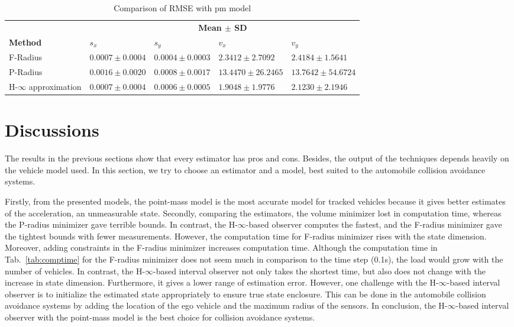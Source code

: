 \begin{table}[!h]
\caption{Comparison of RMSE with pm model}
	\centering
	\renewcommand{\arraystretch}{1.1}
	\small	
	\begin{tabular}{l l l l l}
		\toprule 
		& \multicolumn{4}{c}{\textbf{Mean $\pm$ SD}} \\ \cmidrule{2-5}
		\textbf{Method} & \textbf{$s_x$} & \textbf{$s_y$} & \textbf{$v_x$} & \textbf{$v_y$}\\ \midrule
		F-Radius & $0.0007\pm 0.0004$ &  $0.0004  \pm 0.0003$ &  $2.3412 \pm 2.7092$ &   $2.4184 \pm 1.5641$ \\
		P-Radius & $0.0016 \pm 0.0020$ &   $0.0008 \pm 0.0017$  & $13.4470 \pm 26.2465$ &  $13.7642 \pm 54.6724$\\
		H-$\infty$ approximation & $0.0007 \pm 0.0004$ &  $0.0006 \pm 0.0005$   & $1.9048 \pm  1.9776$  &  $ 2.1230 \pm  2.1946$\\
		\bottomrule
	\end{tabular}
	\label{tab:errormean}
\end{table}

\section{Discussions}
The results in the previous sections show that every estimator has pros and cons. Besides, the output of the techniques depends heavily on the vehicle model used. In this section, we try to choose an estimator and a model, best suited to the automobile collision avoidance systems. 

Firstly, from the presented models, the point-mass model is the most accurate model for tracked vehicles because it gives better estimates of the acceleration, an unmeasurable state. Secondly, comparing the estimators, the volume minimizer lost in computation time, whereas the P-radius minimizer gave terrible bounds. In contrast, the H-$\infty$-based observer computes the fastest, and the F-radius minimizer gave the tightest bounds with fewer measurements. However, the computation time for F-radius minimizer rises with the state dimension. Moreover, adding constraints in the F-radius minimizer increases computation time. Although the computation time in Tab.~\ref{tab:comptime} for the F-radius minimizer does not seem much in comparison to the time step (0.1s), the load would grow with the number of vehicles. In contrast, the H-$\infty$-based interval observer not only takes the shortest time, but also does not change with the increase in state dimension. Furthermore, it gives a lower range of estimation error. However, one challenge with the H-$\infty$-based interval observer is to initialize the estimated state appropriately to ensure true state enclosure. This can be done in the automobile collision avoidance systems by adding the location of the ego vehicle and the maximum radius of the sensors. In conclusion, the H-$\infty$-based interval observer with the point-mass model is the best choice for collision avoidance systems. 

